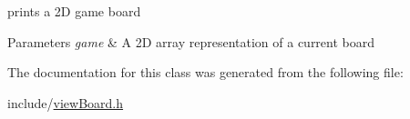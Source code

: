 prints a 2D game board 


\begin{DoxyParams}{Parameters}
{\em game} & A 2D array representation of a current board \\
\hline
\end{DoxyParams}


The documentation for this class was generated from the following file\+:\begin{DoxyCompactItemize}
\item 
include/\hyperlink{view_board_8h}{view\+Board.\+h}\end{DoxyCompactItemize}
